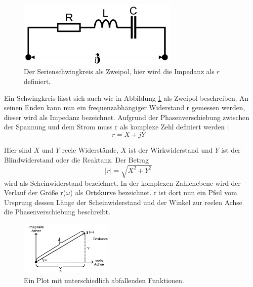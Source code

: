         
        \begin{figure}[H]
            \centering
            \includegraphics[width=0.7\textwidth]{images/Zweipol.PNG}
            \caption{Der Serienschwingkreis als Zweipol, hier wird die Impedanz als $r$ definiert.}
            \label{img:zweip}
        \end{figure}

    \noindent Ein Schwingkreis lässt sich auch wie in Abbildung \ref{img:zweip} als Zweipol beschreiben. An seinen Enden kann nun ein frequenzabhängiger 
    Widerstand r gemessen werden, dieser wird als Impedanz bezeichnet. Aufgrund der Phasenverschiebung zwischen der Spannung und dem Strom muss r als 
    komplexe Zehl definiert werden :
    \begin{equation}
        r = X + jY \nonumber
    \end{equation}

    \noindent Hier sind $X$ und $Y$ reele Widerstände, $X$ ist  der Wirkwiderstand und $Y$ ist der Blindwiderstand oder die Reaktanz. Der Betrag
    \begin{equation}
        |r| = \sqrt{X^2 + Y^2} \nonumber
    \end{equation}
    \noindent wird als Scheinwiderstand bezeichnet. In der komplexen Zahlenebene wird der Verlauf der Größe r($\omega$) als Ortskurve bezeichnet. 
    r ist dort nun ein Pfeil vom Ursprung dessen Länge der Scheinwiderstand und der Winkel zur reelen Achse die Phasenverschiebung 
    beschreibt.

    \begin{figure}[H]
        \centering
        \includegraphics[width=0.4\textwidth]{images/Imaginaer.PNG}
        \caption{Ein Plot mit unterschiedlich abfallenden Funktionen.}
        \label{img:imag}
    \end{figure}

